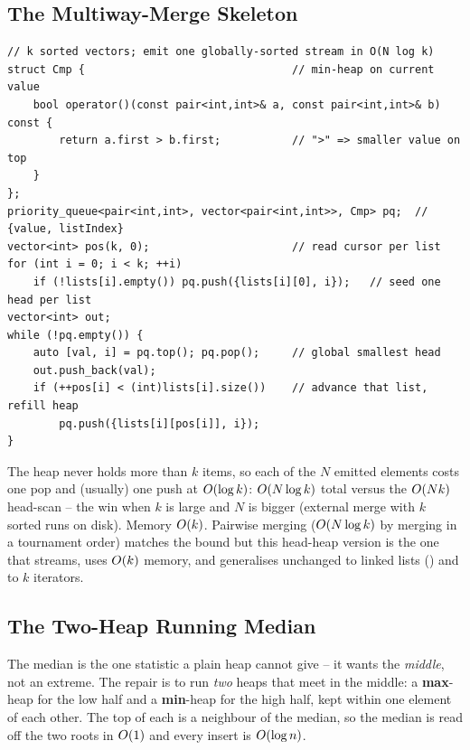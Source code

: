 \subsection{The Multiway-Merge Skeleton}

\begin{lstlisting}[caption={k-way merge with a min-heap of list heads: pop the winner, push its successor}, label={lst:c07-multimerge}]
// k sorted vectors; emit one globally-sorted stream in O(N log k)
struct Cmp {                                // min-heap on current value
    bool operator()(const pair<int,int>& a, const pair<int,int>& b) const {
        return a.first > b.first;           // ">" => smaller value on top
    }
};
priority_queue<pair<int,int>, vector<pair<int,int>>, Cmp> pq;  // {value, listIndex}
vector<int> pos(k, 0);                      // read cursor per list
for (int i = 0; i < k; ++i)
    if (!lists[i].empty()) pq.push({lists[i][0], i});   // seed one head per list
vector<int> out;
while (!pq.empty()) {
    auto [val, i] = pq.top(); pq.pop();     // global smallest head
    out.push_back(val);
    if (++pos[i] < (int)lists[i].size())    // advance that list, refill heap
        pq.push({lists[i][pos[i]], i});
}
\end{lstlisting}

\begin{complexitybox}
The heap never holds more than $k$ items, so each of the $N$ emitted elements costs one pop and (usually)
one push at $O(\log k)$: $O(N\log k)$ total versus the $O(Nk)$ head-scan -- the win when $k$ is
large and $N$ is bigger (external merge with $k$ sorted runs on disk). Memory $O(k)$. Pairwise merging
($O(N\log k)$ by merging in a tournament order) matches the bound but this head-heap version is the one
that streams, uses $O(k)$ memory, and generalises unchanged to linked lists () and to
$k$ iterators.
\end{complexitybox}


\subsection{The Two-Heap Running Median}

The median is the one statistic a plain heap cannot give -- it wants the \emph{middle}, not an extreme. The
repair is to run \emph{two} heaps that meet in the middle: a \textbf{max}-heap for the low half and a
\textbf{min}-heap for the high half, kept within one element of each other. The top of each is a neighbour of
the median, so the median is read off the two roots in $O(1)$ and every insert is $O(\log n)$.


